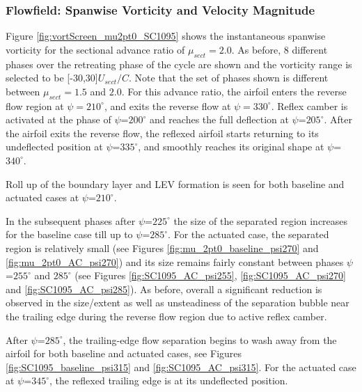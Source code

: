 \subsubsection{Flowfield: Spanwise Vorticity and Velocity Magnitude}

Figure \ref{fig:vortScreen_mu2pt0_SC1095} shows the instantaneous spanwise vorticity for the sectional advance ratio of $\mu_{sect}=2.0$.
As before, 8 different phases over the retreating phase of the cycle are shown and the vorticity range is selected to be [-30,30]$ U_{sect} /C$. Note that the set of phases shown is different between $\mu_{sect}=1.5$ and $2.0$. For this advance ratio, the airfoil enters the reverse flow region at $\psi=210^\circ$, and exits the reverse flow at $\psi=330^\circ$.
Reflex camber is activated at the phase of $\psi$=$200^\circ$ and reaches the full deflection at $\psi$=$205^\circ$.
After the airfoil exits the reverse flow, the reflexed airfoil starts returning to its undeflected position at $\psi$=$335^\circ$, and smoothly reaches its original shape at $\psi$=$340^\circ$.

Roll up of the boundary layer and LEV formation is seen for both baseline and actuated cases at $\psi$=$210^\circ$.

In the subsequent phases after $\psi$=$225^\circ$ the size of the separated region increases for the baseline case till up to $\psi$=$285^\circ$.
For the actuated case, the separated region is relatively small (see Figures \ref{fig:mu_2pt0_baseline_psi270} and \ref{fig:mu_2pt0_AC_psi270}) and its size remains fairly constant between phases $\psi$=$255^\circ$ and $285^\circ$ (see Figures \ref{fig:SC1095_AC_psi255}, \ref{fig:SC1095_AC_psi270} and \ref{fig:SC1095_AC_psi285}).
As before, overall a significant reduction is observed in the size/extent as well as unsteadiness of the separation bubble near the trailing edge during the reverse flow region due to active reflex camber.

After $\psi$=$285^\circ$, the trailing-edge flow separation begins to wash away from the airfoil for both baseline and actuated cases, see Figures \ref{fig:SC1095_baseline_psi315} and \ref{fig:SC1095_AC_psi315}. 
For the actuated case at $\psi$=$345^\circ$, the reflexed trailing edge is at its undeflected position.

